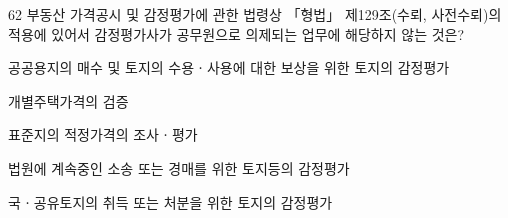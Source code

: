 \begin{question}{62}
부동산 가격공시 및 감정평가에 관한 법령상 「형법」 제129조(수뢰, 사전수뢰)의 적용에 있어서 감정평가사가 공무원으로 의제되는 업무에 해당하지 않는 것은?
\begin{choices}
  \item 공공용지의 매수 및 토지의 수용ㆍ사용에 대한 보상을 위한 토지의 감정평가
  \item 개별주택가격의 검증
  \item 표준지의 적정가격의 조사ㆍ평가
  \item 법원에 계속중인 소송 또는 경매를 위한 토지등의 감정평가
  \item 국ㆍ공유토지의 취득 또는 처분을 위한 토지의 감정평가
\end{choices}
\end{question}
